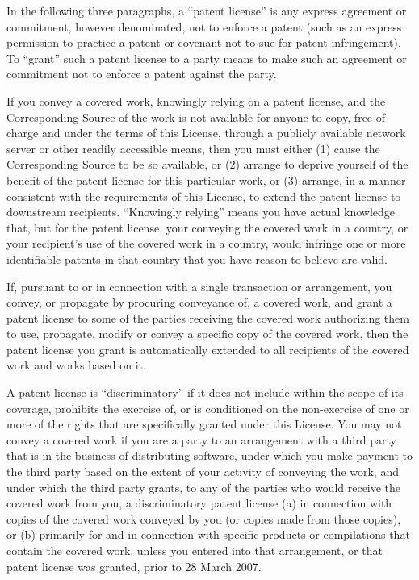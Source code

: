 \documentclass[11pt,twoside,fleqn,openright,titlepage]{cslreport}
\begin{document}
\begin{small}
\begin{enumerate}
In the following three paragraphs, a ``patent license'' is any express
agreement or commitment, however denominated, not to enforce a patent
(such as an express permission to practice a patent or covenant not to
sue for patent infringement).  To ``grant'' such a patent license to a
party means to make such an agreement or commitment not to enforce a
patent against the party.

If you convey a covered work, knowingly relying on a patent license,
and the Corresponding Source of the work is not available for anyone
to copy, free of charge and under the terms of this License, through a
publicly available network server or other readily accessible means,
then you must either (1) cause the Corresponding Source to be so
available, or (2) arrange to deprive yourself of the benefit of the
patent license for this particular work, or (3) arrange, in a manner
consistent with the requirements of this License, to extend the patent
license to downstream recipients.  ``Knowingly relying'' means you have
actual knowledge that, but for the patent license, your conveying the
covered work in a country, or your recipient's use of the covered work
in a country, would infringe one or more identifiable patents in that
country that you have reason to believe are valid.

If, pursuant to or in connection with a single transaction or
arrangement, you convey, or propagate by procuring conveyance of, a
covered work, and grant a patent license to some of the parties
receiving the covered work authorizing them to use, propagate, modify
or convey a specific copy of the covered work, then the patent license
you grant is automatically extended to all recipients of the covered
work and works based on it.

A patent license is ``discriminatory'' if it does not include within
the scope of its coverage, prohibits the exercise of, or is
conditioned on the non-exercise of one or more of the rights that are
specifically granted under this License.  You may not convey a covered
work if you are a party to an arrangement with a third party that is
in the business of distributing software, under which you make payment
to the third party based on the extent of your activity of conveying
the work, and under which the third party grants, to any of the
parties who would receive the covered work from you, a discriminatory
patent license (a) in connection with copies of the covered work
conveyed by you (or copies made from those copies), or (b) primarily
for and in connection with specific products or compilations that
contain the covered work, unless you entered into that arrangement,
or that patent license was granted, prior to 28 March 2007.


\end{enumerate}
\end{small}
\end{document}
